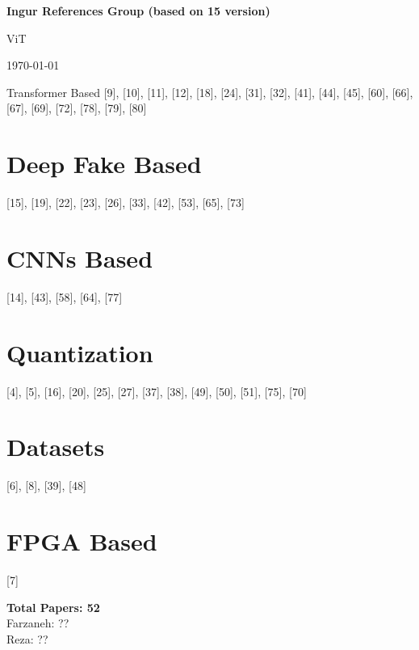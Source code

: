 \documentclass{article}
\newcommand{\maketitletwo}[2][]{\begin{center}
		\Large{\textbf{Ingur References Group \small{(based on 15 version)}}
			
			ViT}
		\vspace{5pt}
		
		\normalsize{\today}
		\vspace{15pt}
		
\end{center}}
\begin{document}
	\maketitletwo[5]
	
	
	\section{Transformer Based}
	[9], [10], [11], [12], [18], [24], [31], [32], [41], [44], [45],
	[60], [66], [67], [69], [72], [78], [79], [80]
	
	
	\section{Deep Fake Based}
	[15], [19], [22], [23], [26], [33], [42], [53], [65], [73]
	
	\section{CNNs Based}
	[14], [43], [58], [64], [77]
	
	\section{Quantization}
	[4], [5], [16], [20], [25], [27], [37], [38], [49], [50], [51], [75], 
	[70]
	
	
	\section{Datasets}
	[6], [8], [39], [48]
	
	
	\section{FPGA Based}
	[7]
	
	\vspace{40pt}
	\centering
	\huge \textbf{Total Papers: 52} \\
	Farzaneh: ?? \\
	Reza: ?? \\
	
	
\end{document}
